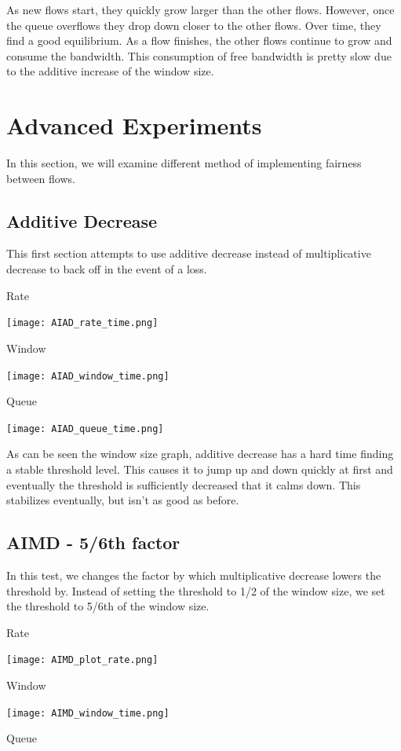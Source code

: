 \documentclass[11pt]{article}
\begin{document}
As new flows start, they quickly grow larger than the other flows. However, once the queue overflows they drop down closer to the other flows. Over time, they find a good equilibrium. As a flow finishes, the other flows continue to grow and consume the bandwidth. This consumption of free bandwidth is pretty slow due to the additive increase of the window size. 

\section{Advanced Experiments}
In this section, we will examine different method of implementing fairness between flows.

\subsection{Additive Decrease}
This first section attempts to use additive decrease instead of multiplicative decrease to back off in the event of a loss.

Rate

\centerline{\texttt{[image: AIAD\_rate\_time.png]}}

Window

\centerline{\texttt{[image: AIAD\_window\_time.png]}}

Queue

\centerline{\texttt{[image: AIAD\_queue\_time.png]}}

As can be seen the window size graph, additive decrease has a hard time finding a stable threshold level. This causes it to jump up and down quickly at first and eventually the threshold is sufficiently decreased that it calms down. This stabilizes eventually, but isn't as good as before.

\subsection{AIMD - 5/6th factor}
In this test, we changes the factor by which multiplicative decrease lowers the threshold by. Instead of setting the threshold to 1/2 of the window size, we set the threshold to 5/6th of the window size.

Rate

\centerline{\texttt{[image: AIMD\_plot\_rate.png]}}

Window

\centerline{\texttt{[image: AIMD\_window\_time.png]}}

Queue
\end{document}
